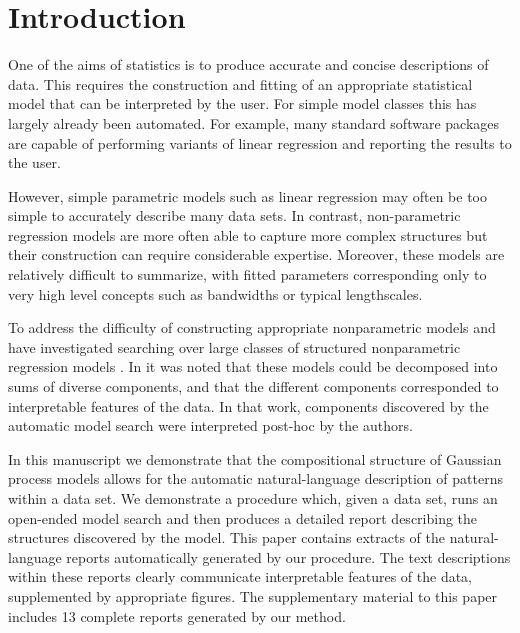 \documentclass[letterpaper]{article}
\def\ie{i.e.\ }
\def\eg{e.g.\ }
\begin{document}
\section{Introduction}
One of the aims of statistics is to produce accurate and concise descriptions of data.
This requires the construction and fitting of an appropriate statistical model that can be interpreted by the user.
For simple model classes this has largely already been automated.
For example, many standard software packages are capable of performing variants of linear regression and reporting the results to the user. 

However, simple parametric models such as linear regression may often be too simple to accurately describe many data sets.
In contrast, non-parametric regression models are more often able to capture more complex structures but their construction can require considerable expertise.
Moreover, these models are relatively difficult to summarize, with fitted parameters corresponding only to very high level concepts such as bandwidths or typical lengthscales.

To address the difficulty of constructing appropriate nonparametric models \citet{diosan2007evolving, bing2010gp, DuvLloGroetal13} and \citet{kronberger2013evolution} have investigated searching over large classes of structured nonparametric regression models .
In \cite{DuvLloGroetal13} it was noted that these models could be decomposed into sums of diverse components, and that the different components corresponded to interpretable features of the data.
In that work, components discovered by the automatic model search were interpreted post-hoc by the authors.

In this manuscript we demonstrate that the compositional structure of Gaussian process models allows for the automatic natural-language description of patterns within a data set.
We demonstrate a procedure which, given a data set, runs an open-ended model search and then produces a detailed report describing the structures discovered by the model. %
%
This paper contains extracts of the natural-language reports automatically generated by our procedure.
The text descriptions within these reports clearly communicate interpretable features of the data, supplemented by appropriate figures.
The supplementary material to this paper includes 13 complete reports generated by our method.
\end{document}
